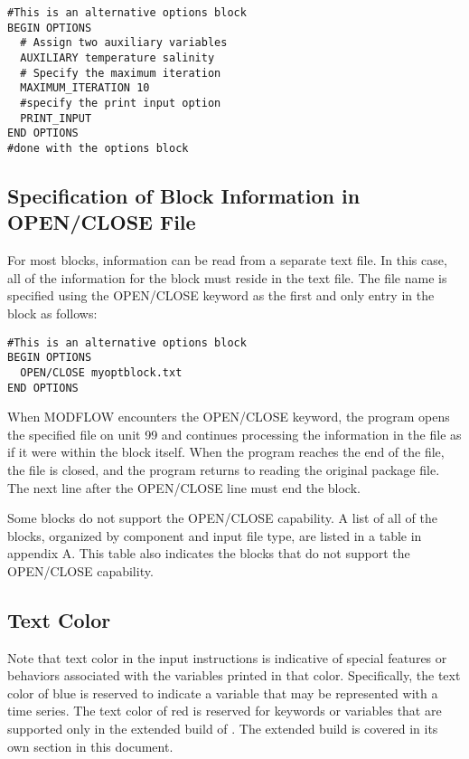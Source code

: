 \begin{lstlisting}[style=inputfile]
#This is an alternative options block
BEGIN OPTIONS
  # Assign two auxiliary variables
  AUXILIARY temperature salinity
  # Specify the maximum iteration
  MAXIMUM_ITERATION 10
  #specify the print input option
  PRINT_INPUT
END OPTIONS
#done with the options block
\end{lstlisting}

\subsection{Specification of Block Information in OPEN/CLOSE File} 
For most blocks, information can be read from a separate text file.  In this case, all of the information for the block must reside in the text file.  The file name is specified using the OPEN/CLOSE keyword as the first and only entry in the block as follows:

\begin{lstlisting}[style=inputfile]
#This is an alternative options block
BEGIN OPTIONS
  OPEN/CLOSE myoptblock.txt
END OPTIONS
\end{lstlisting}

\noindent When MODFLOW encounters the OPEN/CLOSE keyword, the program opens the specified file on unit 99 and continues processing the information in the file as if it were within the block itself.  When the program reaches the end of the file, the file is closed, and the program returns to reading the original package file.  The next line after the OPEN/CLOSE line must end the block.

Some blocks do not support the OPEN/CLOSE capability.  A list of all of the blocks, organized by component and input file type, are listed in a table in appendix A.  This table also indicates the blocks that do not support the OPEN/CLOSE capability.

\subsection{Text Color}

Note that text color in the input instructions is indicative of special features or behaviors associated with the variables printed in that color.  Specifically, the {\color{blue} text color of blue} is reserved to indicate a variable that may be represented with a time series.  The {\color{red} text color of red} is reserved for keywords or variables that are supported only in the extended build of \mf.  The extended build is covered in its own section in this document.


